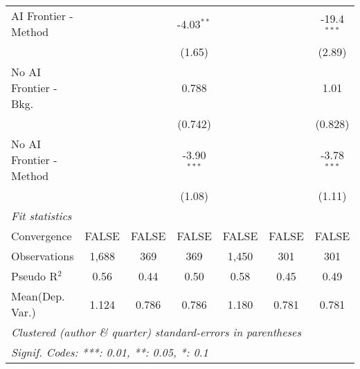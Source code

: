 \begin{tabular}{lcccccc}
   AI Frontier - Method    &         &         & -4.03$^{**}$  &         &         & -19.4$^{***}$\\   
                           &         &         & (1.65)        &         &         & (2.89)\\   
   No AI Frontier - Bkg.   &         &         & 0.788         &         &         & 1.01\\   
                           &         &         & (0.742)       &         &         & (0.828)\\   
   No AI Frontier - Method &         &         & -3.90$^{***}$ &         &         & -3.78$^{***}$\\   
                           &         &         & (1.08)        &         &         & (1.11)\\   
   \midrule
   \emph{Fit statistics}\\
   Convergence             &FALSE    & FALSE   & FALSE         & FALSE   & FALSE   & FALSE\\  
   Observations            & 1,688   & 369     & 369           & 1,450   & 301     & 301\\  
   Pseudo R$^2$            & 0.56    & 0.44    & 0.50          & 0.58    & 0.45    & 0.49\\  
Mean(Dep. Var.) & 1.124 & 0.786 & 0.786 & 1.180 & 0.781 & 0.781 \\
   \midrule \midrule
   \multicolumn{7}{l}{\emph{Clustered (author \& quarter) standard-errors in parentheses}}\\
   \multicolumn{7}{l}{\emph{Signif. Codes: ***: 0.01, **: 0.05, *: 0.1}}\\
\end{tabular}
\par\endgroup
